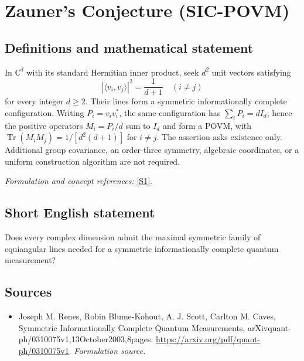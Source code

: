 \documentclass[11pt]{article}
\begin{document}
\section*{\texorpdfstring{Zauner's Conjecture (SIC-POVM)}{Zauner's Conjecture (SIC-POVM)}}\label{statement}
\subsection{Definitions and mathematical statement}
In ${\mathbb{C}}^d$ with its standard Hermitian inner product, seek $d^2$ unit vectors satisfying
\[
 |\langle v_i,v_j\rangle|^2=\frac1{d+1}\quad(i\ne j)
\]
for every integer $d\ge2$. Their lines form a symmetric informationally complete configuration. Writing $P_i=v_iv_i^*$, the same configuration has
$\sum_iP_i=dI_d$; hence the positive operators $M_i=P_i/d$ sum to $I_d$ and form a POVM, with
$\operatorname{Tr}(M_iM_j)=1/[d^2(d+1)]$ for $i\ne j$. The assertion asks existence only. Additional group covariance, an order-three symmetry, algebraic coordinates, or a uniform construction algorithm are not required.
\par\smallskip\textit{Formulation and concept references:} \href{https://arxiv.org/pdf/quant-ph/0310075v1}{[S1]}.

\subsection{Short English statement}
Does every complex dimension admit the maximal symmetric family of equiangular lines needed for a symmetric informationally complete quantum measurement?
\subsection{Sources}
\begin{itemize}
\item[S1]Joseph M. Renes, Robin Blume-Kohout, A. J. Scott, Carlton M. Caves, Symmetric Informationally Complete Quantum Measurements, arXivquant-ph/0310075v1,13October2003,8pages.
\url{https://arxiv.org/pdf/quant-ph/0310075v1}.
\textit{Formulation source.}
\end{itemize}
\end{document}
